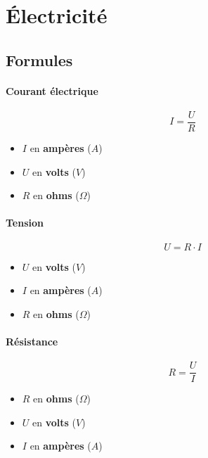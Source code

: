 \documentclass[]{article}
\date{}
\let\oldparagraph\paragraph
\renewcommand{\paragraph}[1]{\oldparagraph{#1}\mbox{}}
\begin{document}
\section{Électricité}\label{electricite}

\subsection{Formules}\label{formules}



\paragraph{Courant électrique}\label{courant-electrique}

{\large $$ I = \dfrac{U}{R} $$ }


\begin{itemize}
	\item 
		$ I $ en \textbf{ampères} ($A$)
	\item
		$ U $ en \textbf{volts} ($V$)
	\item
		$ R $ en \textbf{ohms} ($\Omega$)
\end{itemize}



\paragraph{Tension}\label{tension}


{\large $$ U = R \cdot I $$ }

\begin{itemize}
	\item 
		$ U $ en \textbf{volts} ($V$)
	\item
		$ I $ en \textbf{ampères} ($A$)
	\item
		$ R $ en \textbf{ohms} ($\Omega$)
\end{itemize}



\paragraph{Résistance}\label{resistance}

{\large $$ R = \dfrac{U}{I} $$ }

\begin{itemize}
	\item 
		$ R $ en \textbf{ohms} ($\Omega$)
	\item
		$ U $ en \textbf{volts} ($V$)
	\item
		$ I $ en \textbf{ampères} ($A$)
\end{itemize}
\end{document}
